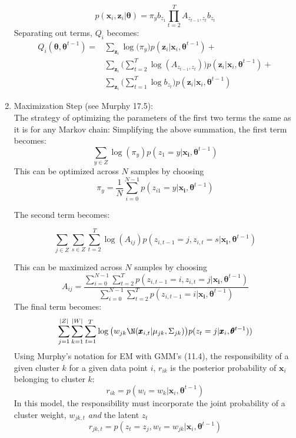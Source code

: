 \documentclass{article}
\begin{document}
\begin{enumerate}
	$$
	p(\pmb{x}_i, \pmb{z}_i | \pmb{\theta}) = \pi_y b_{z_1} \prod_{t=2}^{T} A_{z_{t-1}, z_t} b_{z_t}
	$$
	Separating out terms, $Q_i$ becomes: 
	\begin{align*}
		Q_i(\pmb{\theta}, \pmb{\theta}^{t-1}) = 
		&\sum_{\pmb{z}_i}\log \big(\pi_y \big) p(\pmb{z}_i | \pmb{x}_i, \pmb{\theta}^{t-1}) + \\
		&\sum_{\pmb{z}_i}\bigg(\sum_{t=2}^{T}\log(A_{z_{t-1}, z_t}) \bigg) p(\pmb{z}_i | \pmb{x}_i, \pmb{\theta}^{t-1}) + \\
		&\sum_{\pmb{z}_i}\bigg(\sum_{t=1}^{T} \log b_{z_t}\bigg) p(\pmb{z}_i | \pmb{x}_i, \pmb{\theta}^{t-1})
	\end{align*}
	
	\item Maximization Step (see Murphy 17.5): \\
	The strategy of optimizing the parameters of the first two terms the same as it is for any Markov chain: 
	Simplifying the above summation, the first term becomes: 
	$$
	\sum_{y \in Z} \log(\pi_{y}) p(z_1 = y |\pmb{x_i},  \pmb{\theta}^{t-1}) 
	$$
	This can be optimized across $N$ samples by choosing
	$$
	\pi_y = %
	 \frac{1}{N}\sum_{i=0}^{N-1} p(z_{i1} = y| \pmb{x_i},\pmb{\theta}^{t-1}) 
	$$
	
	The second term becomes: 
	
	$$
	\sum_{j\in Z} \sum_{s \in Z}  \sum_{t=2}^{T} \log(A_{ij}) p(z_{i, t-1} = j, z_{i, t} = s | \pmb{x_i},  \pmb{\theta}^{t-1}) 
	$$
	
	This can be maximized across $N$ samples by choosing
	$$
	A_{ij} = \frac{\sum_{i=0}^{N-1} \sum_{t=2}^{T} p(z_{i, t-1} = i, z_{i, t} = j | \pmb{x_i},  \pmb{\theta}^{t-1})}
	{\sum_{i=0}^{N-1} \sum_{t=2}^{T} p(z_{i, t-1} = i | \pmb{x_i},  \pmb{\theta}^{t-1})}
	$$
	The final term becomes: 
	$$
	\sum_{j=1}^{|Z|} \sum_{k=1}^{|W|} \sum_{t=1}^{T} \log \big( w_{jk} \N (\pmb{x}_{i,t} | \mu_{jk}, \Sigma_{jk}) \big) p(z_t = j | \pmb{x}_i, \pmb{\theta}^{t-1}))
	$$
	Using Murphy's notation for EM with GMM's (11.4), the responsibility of a given cluster $k$ for a given data point $i$, $r_{ik}$ is the posterior probability of $\pmb{x}_i$ belonging to cluster $k$: 
	$$
	r_{ik} = p(w_i = w_k | \pmb{x}_{i}, \pmb{\theta}^{t-1})
	$$
	In this model, the responsibility must incorporate the joint probability of a cluster weight, $w_{jk,t}$ \textit{and} the latent $z_{t}$
	$$
	r_{jk, t} = p(z_t = z_{j}, w_t = w_{jk} | \pmb{x}_i, \pmb{\theta}^{t-1})
	$$
	

\end{enumerate}
\end{document}
